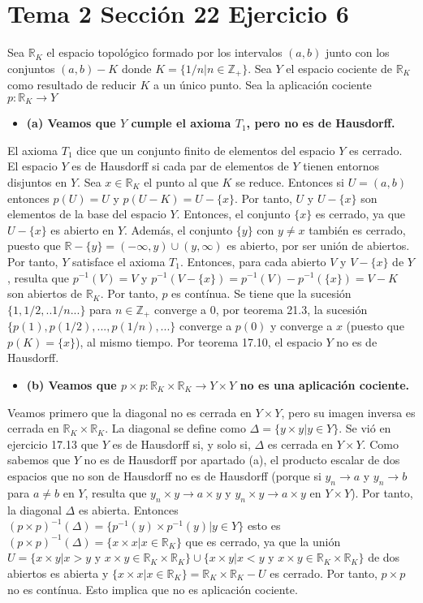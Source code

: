 \documentclass{article}
\begin{document}
\section{Tema 2 Sección 22 Ejercicio 6}
Sea $\mathbb{R}_K$ el espacio topológico formado por los intervalos $(a,b)$ junto con los conjuntos $(a,b)-K$ donde $K=\{1/n| n\in \mathbb{Z}_+\}$. Sea $Y$ el espacio cociente de $\mathbb{R}_K$ como resultado de reducir $K$ a un único punto. Sea la aplicación cociente $p:\mathbb{R}_K\rightarrow Y$
\begin{itemize}
\item \bf (a) \rm Veamos que $Y$ cumple el axioma $T_1$, pero no es de Hausdorff.
\end{itemize}
El axioma $T_1$ dice que un conjunto finito de elementos del espacio $Y$ es cerrado. El espacio $Y$ es de Hausdorff si cada par de elementos de $Y$ tienen entornos disjuntos en $Y$. Sea $x\in \mathbb{R}_K$ el punto al que $K$ se reduce. Entonces  si $U=(a,b)$ entonces $p(U)=U$ y $p(U-K)=U-\{x\}$. Por tanto, $U$ y $U-\{x\}$ son elementos de la base del espacio $Y$. Entonces, el conjunto $\{x\}$ es cerrado, ya que $U-\{x\}$ es abierto en $Y$. Además, el conjunto $\{y\}$ con $y\neq x$ también es cerrado, puesto que $\mathbb{R}-\{y\}=(-\infty,y)\cup (y,\infty)$ es abierto, por ser unión de abiertos. Por tanto, $Y$ satisface el axioma $T_1$. Entonces, para cada abierto $V$ y $V-\{x\}$ de $Y$, resulta que $p^{-1}(V)=V$ y $p^{-1}(V-\{x\})=p^{-1}(V)-p^{-1}(\{x\})=V-K$ son abiertos de $\mathbb{R}_K$. Por tanto, $p$ es contínua. Se tiene que la sucesión $\{1,1/2,..1/n...\}$ para $n\in \mathbb{Z}_+$ converge a $0$, por teorema 21.3, la sucesión $\{p(1), p(1/2),..., p(1/n),...\}$ converge a $p(0)$ y converge a $x$ (puesto que $p(K)=\{x\}$), al mismo tiempo. Por teorema 17.10, el espacio $Y$ no es de Hausdorff.
\begin{itemize}
\item \bf (b) \rm Veamos que $p\times p :\mathbb{R}_K\times \mathbb{R}_K\rightarrow Y\times Y$ no es una aplicación cociente.
\end{itemize}
Veamos primero que la diagonal no es cerrada en $Y\times Y$, pero su imagen inversa es cerrada en $\mathbb{R}_K\times \mathbb{R}_K$. La diagonal se define como $\Delta = \{y\times y| y\in Y\}$. Se vió en ejercicio 17.13 que $Y$ es de Hausdorff si, y solo si, $\Delta $ es cerrada en $Y\times Y$. Como sabemos que $Y$ no es de Hausdorff por apartado (a), el producto escalar de dos espacios que no son de Hausdorff no es de Hausdorff (porque si $y_n \rightarrow a$ y $y_n \rightarrow b$ para $a\neq b$ en $Y$, resulta que $y_n \times y\rightarrow a\times y$ y $y_n \times y\rightarrow a\times y$  en $Y\times Y$). Por tanto, la diagonal $\Delta$ es abierta. Entonces $(p\times p)^{-1}(\Delta)=\{p^{-1}(y)\times p^{-1}(y)|y\in Y\}$ esto es $(p\times p)^{-1}(\Delta)=\{x\times x|x\in \mathbb{R}_K\}$ que es cerrado, ya que la unión $U=\{x\times y|x>y\text{ y }x\times y\in \mathbb{R}_K\times \mathbb{R}_K\}\cup \{x\times y|x<y\text{ y }x\times y\in \mathbb{R}_K\times \mathbb{R}_K\}$ de dos abiertos es abierta y $\{x\times x|x\in \mathbb{R}_K\}=\mathbb{R}_K\times \mathbb{R}_K-U$ es cerrado. Por tanto, $p\times p$ no es contínua. Esto implica que no es aplicación cociente.
\end{document}
